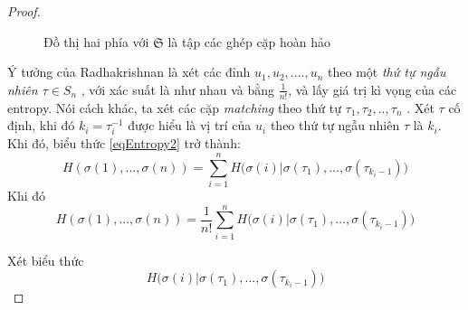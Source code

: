 \documentclass[a4paper, 12pt]{report}
\begin{document}
\begin{proof}
\begin{figure}
\begin{center}
	\caption{Đồ thị hai phía với $\mathfrak{S}$ là tập các ghép cặp hoàn hảo}
	\label{fig:image1}
\end{center}
\end{figure}
Ý tưởng của Radhakrishnan là xét các đỉnh  $u_{1}, u_{2}, ....  , u_{n}$ theo một \textit{thứ tự ngẫu nhiên $\tau \in S_{n}$} , với xác suất là như nhau và bằng $\frac{1}{n!}$, và lấy giá trị kì vọng của các entropy. Nói cách khác, ta xét các cặp \textit{matching} theo thứ tự $\tau_{1},\tau_{2},..,\tau_{n}$ . Xét $\tau$ cố định, khi đó $k_{i} = \tau ^{-1}_{i}$ được hiểu là vị trí của $u_{i}$ theo thứ tự ngẫu nhiên $\tau$ là $k_{i}$. Khi đó, biểu thức \eqref{eqEntropy2} trở thành:
\begin{equation*}
	H(\sigma(1),...,\sigma(n)) = \displaystyle \sum_{i=1}^{n}H\Big(\sigma (i)| \sigma (\tau_{1}),...,\sigma (\tau_{k_{i}-1})\Big)
\end{equation*}
Khi đó
\begin{equation*}
	H(\sigma(1),...,\sigma(n)) = \frac{1}{n!}\displaystyle \sum_{i=1}^{n}H\Big(\sigma (i)| \sigma (\tau_{1}),...,\sigma (\tau_{k_{i}-1})\Big)
\end{equation*}

Xét biểu thức 
\begin{equation}
H\Big(\sigma (i)| \sigma (\tau_{1}),...,\sigma (\tau_{k_{i}-1})\Big) \label{eqEntropy}
\end{equation}


\end{proof}
\end{document}
